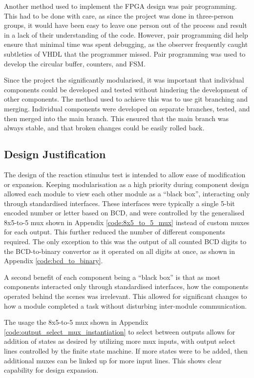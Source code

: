 \documentclass[11pt]{article}
\begin{document}
Another method used to implement the FPGA design was pair programming. This had to be done with care, as since the project was done in three-person groups, it would have been easy to leave one person out of the process and result in a lack of their understanding of the code. However, pair programming did help ensure that minimal time was spent debugging, as the observer frequently caught subtleties of VHDL that the programmer missed. Pair programming was used to develop the circular buffer, counters, and FSM.

Since the project the significantly modularised, it was important that individual components could be developed and tested without hindering the development of other components. The method used to achieve this was to use git branching and merging. Individual components were developed on separate branches, tested, and then merged into the main branch. This ensured that the main branch was always stable, and that broken changes could be easily rolled back.

\subsection{Design Justification}
The design of the reaction stimulus test is intended to allow ease of modification or expansion. Keeping modularisation as a high priority during component design allowed each module to view each other module as a ``black box'', interacting only through standardised interfaces. These interfaces were typically a single 5-bit encoded number or letter based on BCD, and were controlled by the generalised 8x5-to-5 mux shown in Appendix \ref{code:8x5_to_5_mux} instead of custom muxes for each output. This further reduced the number of different components required. The only exception to this was the output of all counted BCD digits to the BCD-to-binary convertor as it operated on all digits at once, as shown in Appendix \ref{code:bcd_to_binary}.

A second benefit of each component being a ``black box'' is that as most components interacted only through standardised interfaces, how the components operated behind the scenes was irrelevant. This allowed for significant changes to how a module completed a task without disturbing inter-module communication.

The usage the 8x5-to-5 mux shown in Appendix \ref{code:output_select_mux_instantiation} to select between outputs allows for addition of states as desired by utilizing more mux inputs, with output select lines controlled by the finite state machine. If more states were to be added, then additional muxes can be linked up for more input lines. This shows clear capability for design expansion.
\end{document}

